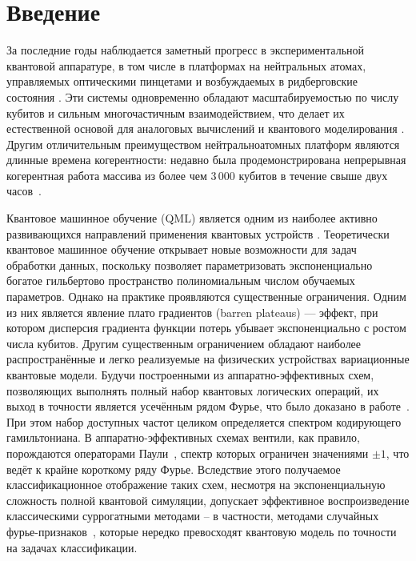 \section{Введение}
\label{sec:Chapter0} 

За последние годы наблюдается заметный прогресс в экспериментальной квантовой аппаратуре, в том числе в платформах на нейтральных атомах, 
управляемых оптическими пинцетами и возбуждаемых в ридберговские состояния \cite{saffman2010quantum,browaeys2020manybody}.
Эти системы одновременно обладают масштабируемостью по числу кубитов и сильным многочастичным взаимодействием,
что делает их естественной основой для аналоговых вычислений и квантового моделирования
\cite{ebadi2021phases,wurtz2023aquila}. Другим отличительным преимуществом нейтральноатомных платформ являются длинные времена когерентности:
недавно была продемонстрирована непрерывная когерентная работа массива из более чем 3\,000 кубитов в течение свыше двух часов~\cite{chiu2025continuous}.


Квантовое машинное обучение (QML) является одним из наиболее активно развивающихся направлений применения квантовых устройств
\cite{biamonte2017qml,schuld2021mlqc}.
Теоретически квантовое машинное обучение открывает новые возможности для задач обработки данных, поскольку позволяет
параметризовать экспоненциально богатое гильбертово пространство полиномиальным числом обучаемых параметров. Однако на практике
проявляются существенные ограничения. Одним из них является явление плато градиентов (barren plateaus)
\cite{mcclean2018barren,cerezo2021vqa} --- эффект, при котором дисперсия градиента функции потерь убывает экспоненциально с ростом числа
кубитов.
Другим существенным ограничением обладают наиболее распространённые и легко реализуемые на физических устройствах вариационные
квантовые модели.
Будучи построенными из аппаратно-эффективных схем, позволяющих выполнять полный набор квантовых логических операций, их выход в
точности является усечённым рядом Фурье, что было доказано в работе~\cite{schuld2020encoding}. При этом набор доступных частот целиком
определяется спектром кодирующего гамильтониана. В аппаратно-эффективных схемах вентили, как правило, порождаются операторами
Паули~\cite{kandala2017vqe,benedetti2019pqc,kordzanganeh2023parallel}, спектр которых ограничен значениями $\pm1$, что ведёт к крайне короткому ряду Фурье. Вследствие этого получаемое классификационное
отображение таких схем, несмотря на экспоненциальную сложность полной квантовой симуляции, допускает эффективное воспроизведение
классическими суррогатными методами -- в частности, методами случайных фурье-признаков~\cite{landman2022rff,sweke2025rfflimits},
которые нередко превосходят квантовую модель по точности на задачах классификации.


